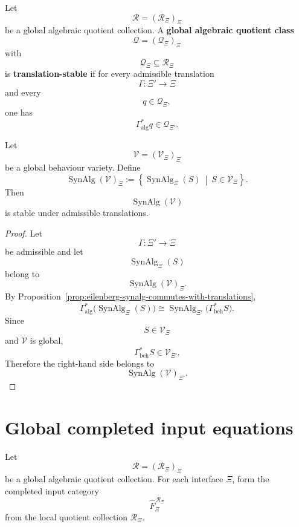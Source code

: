 \begin{definition}
\label{def:eilenberg-global-algebraic-quotient-class}
Let
\[
\mathcal R=(\mathcal R_\Xi)_\Xi
\]
be a global algebraic quotient collection. A \textbf{global algebraic
quotient class}
\[
\mathcal Q=(\mathcal Q_\Xi)_\Xi
\]
with
\[
\mathcal Q_\Xi\subseteq\mathcal R_\Xi
\]
is \textbf{translation-stable} if for every admissible translation
\[
\Gamma:\Xi'\to\Xi
\]
and every
\[
q\in\mathcal Q_\Xi,
\]
one has
\[
\Gamma_{\mathrm{alg}}^\ast q\in\mathcal Q_{\Xi'}.
\]
\end{definition}

\begin{proposition}
\label{prop:eilenberg-syntactic-quotients-global-varieties}
Let
\[
\mathcal V=(\mathcal V_\Xi)_\Xi
\]
be a global behaviour variety. Define
\[
\operatorname{SynAlg}(\mathcal V)_\Xi
:=
\left\{
\operatorname{SynAlg}_{\Xi}(S)
\ \middle|\
S\in\mathcal V_\Xi
\right\}.
\]
Then
\[
\operatorname{SynAlg}(\mathcal V)
\]
is stable under admissible translations.
\end{proposition}

\begin{proof}
Let
\[
\Gamma:\Xi'\to\Xi
\]
be admissible and let
\[
\operatorname{SynAlg}_{\Xi}(S)
\]
belong to
\[
\operatorname{SynAlg}(\mathcal V)_\Xi.
\]
By Proposition~\ref{prop:eilenberg-synalg-commutes-with-translations},
\[
\Gamma_{\mathrm{alg}}^\ast
\bigl(
\operatorname{SynAlg}_{\Xi}(S)
\bigr)
\cong
\operatorname{SynAlg}_{\Xi'}
\bigl(
\Gamma_{\mathrm{beh}}^\ast S
\bigr).
\]
Since
\[
S\in\mathcal V_\Xi
\]
and \(\mathcal V\) is global,
\[
\Gamma_{\mathrm{beh}}^\ast S\in\mathcal V_{\Xi'}.
\]
Therefore the right-hand side belongs to
\[
\operatorname{SynAlg}(\mathcal V)_{\Xi'}.
\]
\end{proof}

\section{Global completed input equations}
\label{sec:eilenberg-global-completed-input-equations}

Let
\[
\mathcal R=(\mathcal R_\Xi)_\Xi
\]
be a global algebraic quotient collection. For each interface \(\Xi\), form
the completed input category
\[
\widehat F_\Xi^{\,\mathcal R_\Xi}
\]
from the local quotient collection \(\mathcal R_\Xi\).

